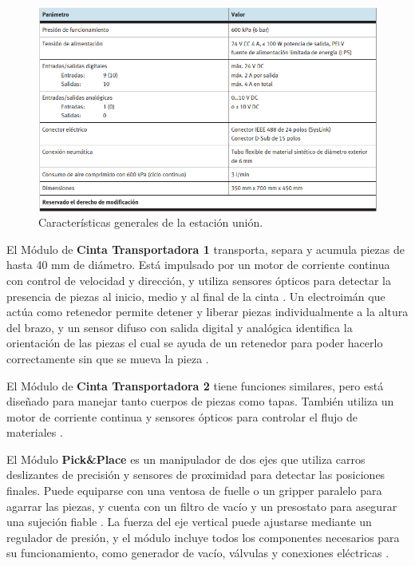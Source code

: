 \begin{figure} [h!]
  \begin{center}
    \includegraphics[width=15cm]{figs/estacion_union_3}
  \end{center}
  \caption{\centering Características generales de la estación unión. \cite{estacion_union}}
  \label{fig:estacion_union_3}
\end{figure} 

El Módulo de \textbf{Cinta Transportadora 1} transporta, separa y acumula piezas de hasta 40 mm de diámetro. Está impulsado por un motor de corriente continua con control de velocidad y dirección, y utiliza sensores ópticos para detectar la presencia de piezas al inicio, medio y al final de la cinta \cite{estacion_union}. Un electroimán que actúa como retenedor permite detener y liberar piezas individualmente a la altura del brazo, y un sensor difuso con salida digital y analógica identifica la orientación de las piezas el cual se ayuda de un retenedor para poder hacerlo correctamente sin que se mueva la pieza \cite{estacion_union}.

El Módulo de \textbf{Cinta Transportadora 2} tiene funciones similares, pero está diseñado para manejar tanto cuerpos de piezas como tapas. También utiliza un motor de corriente continua y sensores ópticos para controlar el flujo de materiales \cite{estacion_union}.

El Módulo \textbf{Pick\&Place} es un manipulador de dos ejes que utiliza carros deslizantes de precisión y sensores de proximidad para detectar las posiciones finales. Puede equiparse con una ventosa de fuelle o un gripper paralelo para agarrar las piezas, y cuenta con un filtro de vacío y un presostato para asegurar una sujeción fiable \cite{estacion_union}. La fuerza del eje vertical puede ajustarse mediante un regulador de presión, y el módulo incluye todos los componentes necesarios para su funcionamiento, como generador de vacío, válvulas y conexiones eléctricas \cite{estacion_union}.


